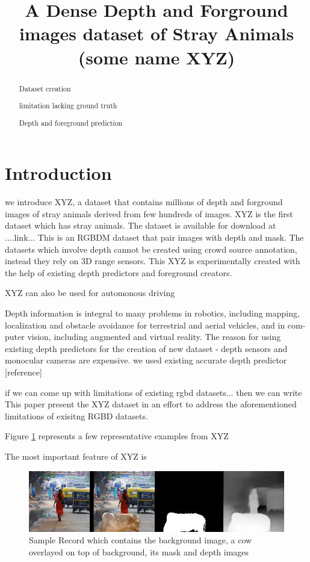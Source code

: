 \documentclass{article}
\title{A Dense Depth and Forground images dataset of Stray Animals (some name XYZ)}
\begin{document}
\maketitle

\begin{abstract}
Dataset creation

limitation lacking ground truth

Depth and foreground prediction


\end{abstract}

 

\section{Introduction}

we introduce XYZ, a dataset that contains millions of depth and forground images of stray animals derived from few hundreds of images. XYZ is the first dataset which has stray animals. The dataset is available for download at ....link...
This is an RGBDM dataset that pair images with depth and mask. The datasets which involve depth cannot be created using crowd source annotation, instead they rely on 3D range sensors. This XYZ is experimentally created with the help of existing depth predictors and foreground creators.

XYZ can also be used for automonous driving


Depth information is integral to many problems in
robotics, including mapping, localization and obstacle avoidance for terrestrial and aerial vehicles, and in com- puter vision, including augmented and virtual reality\cite{marchand2015pose}.
The reason for using existing depth predictors for the creation of new dataset - depth sensors and monocular cameras are expensive. we used existing accurate depth predictor [reference]

if we can come up with limitations of existing rgbd datasets... then we can write This paper present the XYZ dataset in an effort to address the aforementioned limitations of exisitng RGBD datasets.

Figure \ref{fig:samplerecord} represents a few representative examples from XYZ

The most important feature of XYZ is 

\begin{figure}[h!]
\centering
  \includegraphics[width=1\textwidth]{samplerecord.png}
  \caption{Sample Record which contains the background image, a cow overlayed on top of background, its mask and depth images}
  \label{fig:samplerecord}
\end{figure}
\end{document}

